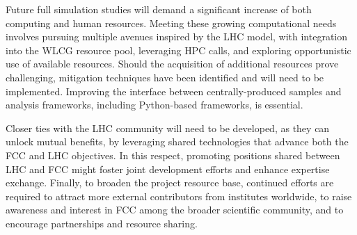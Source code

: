 Future full simulation studies will demand a significant increase of both computing and human resources. 
Meeting these growing computational needs involves pursuing multiple avenues inspired by the LHC model, 
with integration into the WLCG resource pool, leveraging HPC calls, and exploring opportunistic use of available resources. 
Should the acquisition of additional resources prove challenging, mitigation techniques have been identified and will need to be implemented. 
Improving the interface between centrally-produced samples and analysis frameworks, 
including Python-based frameworks, is essential. 

Closer ties with the LHC community will need to be developed, as they can unlock mutual benefits, 
by leveraging shared technologies that advance both the FCC and LHC objectives.  
In this respect, promoting positions shared between LHC and FCC might foster joint development efforts and enhance expertise exchange. 
Finally, to broaden the project resource base, continued efforts are required to attract more external contributors from institutes worldwide, 
to raise awareness and interest in FCC among the broader scientific community, 
and to encourage partnerships and resource sharing.